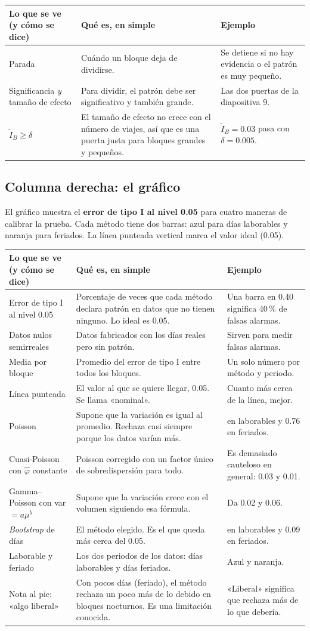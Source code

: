 \documentclass[11pt,a4paper]{article}
\makeatletter
\newenvironment{partes}{%
  \begin{longtable}{@{}>{\raggedright\arraybackslash}p{4.3cm}>{\raggedright\arraybackslash}p{6.0cm}>{\raggedright\arraybackslash}p{5.0cm}@{}}
  \toprule \textbf{Lo que se ve (y cómo se dice)} & \textbf{Qué es, en simple} & \textbf{Ejemplo}\\ \midrule \endhead}{%
  \bottomrule\end{longtable}}
\newcommand{\se}[1]{\newline{\small\color{ucspblue}(se dice «#1»)}}
\makeatother
\begin{document}
\begin{partes}
Parada & Cuándo un bloque deja de dividirse. & Se detiene si no hay evidencia o el patrón es muy pequeño. \\
Significancia \emph{y} tamaño de efecto & Para dividir, el patrón debe ser significativo y también grande. & Las dos puertas de la diapositiva 9. \\
$\tilde I_B\ge\delta$ \se{I tilde de B mayor o igual que delta} & El tamaño de efecto no crece con el número de viajes, así que es una puerta justa para bloques grandes y pequeños. & $\tilde I_B=0.03$ pasa con $\delta=0.005$. \\
\end{partes}

\subsection*{Columna derecha: el gráfico}

El gráfico muestra el \textbf{error de tipo I al nivel 0.05} para cuatro maneras de calibrar la prueba. Cada método tiene dos barras: azul para días laborables y naranja para feriados. La línea punteada vertical marca el valor ideal (0.05).

\begin{partes}
Error de tipo I al nivel 0.05 & Porcentaje de veces que cada método declara patrón en datos que no tienen ninguno. Lo ideal es 0.05. & Una barra en 0.40 significa 40\,\% de falsas alarmas. \\
Datos nulos semirreales & Datos fabricados con los días reales pero sin patrón. & Sirven para medir falsas alarmas. \\
Media por bloque & Promedio del error de tipo I entre todos los bloques. & Un solo número por método y periodo. \\
Línea punteada \se{nominal cero cinco} & El valor al que se quiere llegar, 0.05. Se llama «nominal». & Cuanto más cerca de la línea, mejor. \\
Poisson & Supone que la variación es igual al promedio. Rechaza casi siempre porque los datos varían más. & 0.40 en laborables y 0.76 en feriados. \\
Cuasi-Poisson \se{cuasi-poasón} con $\hat\varphi$ constante \se{fi sombrero} & Poisson corregido con un factor único de sobredispersión para todo. & Es demasiado cauteloso en general: 0.03 y 0.01. \\
Gamma--Poisson \se{gama-poasón} con var $=a\mu^b$ \se{varianza igual a a por mu a la b} & Supone que la variación crece con el volumen siguiendo esa fórmula. & Da 0.02 y 0.06. \\
\emph{Bootstrap} de días & El método elegido. Es el que queda más cerca del 0.05. & 0.04 en laborables y 0.09 en feriados. \\
Laborable y feriado & Los dos periodos de los datos: días laborables y días feriados. & Azul y naranja. \\
Nota al pie: «algo liberal» & Con pocos días (feriado), el método rechaza un poco más de lo debido en bloques nocturnos. Es una limitación conocida. & «Liberal» significa que rechaza más de lo que debería. \\
\end{partes}
\end{document}

